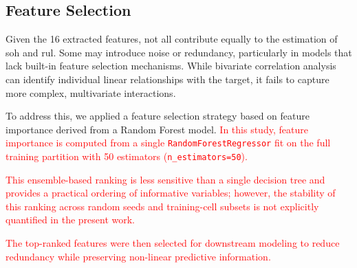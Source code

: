 \subsection{Feature Selection}

Given the 16 extracted features, not all contribute equally to the estimation of \ac{soh} and \ac{rul}. Some may introduce noise or redundancy, particularly in models that lack built-in feature selection mechanisms. While bivariate correlation analysis can identify individual linear relationships with the target, it fails to capture more complex, multivariate interactions.

To address this, we applied a feature selection strategy based on feature importance derived from a Random Forest model. \textcolor{red}{In this study, feature importance is computed from a single \texttt{RandomForestRegressor} fit on the full training partition with 50 estimators (\texttt{n\_estimators=50}).}

\textcolor{red}{This ensemble-based ranking is less sensitive than a single decision tree and provides a practical ordering of informative variables; however, the stability of this ranking across random seeds and training-cell subsets is not explicitly quantified in the present work.}

\textcolor{red}{The top-ranked features were then selected for downstream modeling to reduce redundancy while preserving non-linear predictive information.}
